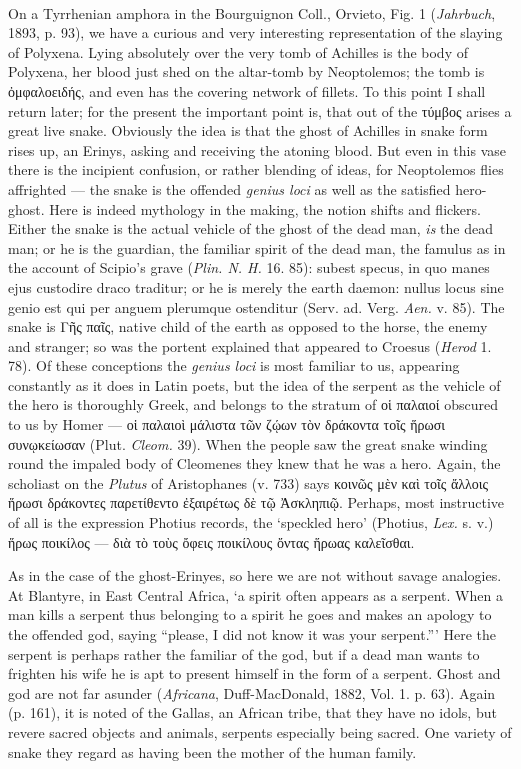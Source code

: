 \documentclass[a4paper, 11pt, oneside, polutonikogreek, english]{article}
\begin{document}
\paragraph{}
On a Tyrrhenian amphora in the Bourguignon Coll., Orvieto, Fig. 1 (\emph{Jahrbuch}, 1893, p. 93), we have a curious and very interesting representation of the slaying of Polyxena. Lying absolutely over the very tomb of Achilles is the body of Polyxena, her blood just shed on the altar-tomb by Neoptolemos; the tomb is ὀμφαλοειδής, and even has the covering network of fillets. To this point I shall return later; for the present the important point is, that out of the τύμβος arises a great live snake. Obviously the idea is that the ghost of Achilles in snake form rises up, an Erinys, asking and receiving the atoning blood. But even in this vase there is the incipient confusion, or rather blending of ideas, for Neoptolemos flies affrighted --- the snake is the offended \emph{genius loci} as well as the satisfied hero-ghost. Here is indeed mythology in the making, the notion shifts and flickers. Either the snake is the actual vehicle of the ghost of the dead man, \emph{is} the dead man; or he is the guardian, the familiar spirit of the dead man, the famulus as in the account of Scipio's grave (\emph{Plin. N. H.} 16. 85): subest specus, in quo manes ejus custodire draco traditur; or he is merely the earth daemon: nullus locus sine genio est qui per anguem plerumque ostenditur (Serv. ad. Verg. \emph{Aen.} v. 85). The snake is Γῆς παῖς, native child of the earth as opposed to the horse, the enemy and stranger; so was the portent explained that appeared to Croesus (\emph{Herod} 1. 78). Of these conceptions the \emph{genius loci} is most familiar to us, appearing constantly as it does in Latin poets, but the idea of the serpent as the vehicle of the hero is thoroughly Greek, and belongs to the stratum of οἱ παλαιοί obscured to us by Homer --- οἱ παλαιοὶ μάλιστα τῶν ζῴων τὸν δράκοντα τοῖς ἥρωσι συνῳκείωσαν (Plut. \emph{Cleom.} 39). When the people saw the great snake winding round the impaled body of Cleomenes they knew that he was a hero. Again, the scholiast on the \emph{Plutus} of Aristophanes (v. 733) says κοινῶς μὲν καὶ τοῖς ἄλλοις ἥρωσι δράκοντες παρετίθεντο ἐξαιρέτως δὲ τῷ Ἀσκληπιῷ. Perhaps, most instructive of all is the expression Photius records, the `speckled hero' (Photius, \emph{Lex.} s. v.) ἥρως ποικίλος --- διὰ τὸ τοὺς ὄφεις ποικίλους ὄντας ἥρωας καλεῖσθαι.

As in the case of the ghost-Erinyes, so here we are not without savage analogies. At Blantyre, in East Central Africa, `a spirit often appears as a serpent. When a man kills a serpent thus belonging to a spirit he goes and makes an apology to the offended god, saying ``please, I did not know it was your serpent.''' Here the serpent is perhaps rather the familiar of the god, but if a dead man wants to frighten his wife he is apt to present himself in the form of a serpent. Ghost and god are not far asunder (\emph{Africana}, Duff-MacDonald, 1882, Vol. 1. p. 63). Again (p. 161), it is noted of the Gallas, an African tribe, that they have no idols, but revere sacred objects and animals, serpents especially being sacred. One variety of snake they regard as having been the mother of the human family.
\end{document}
